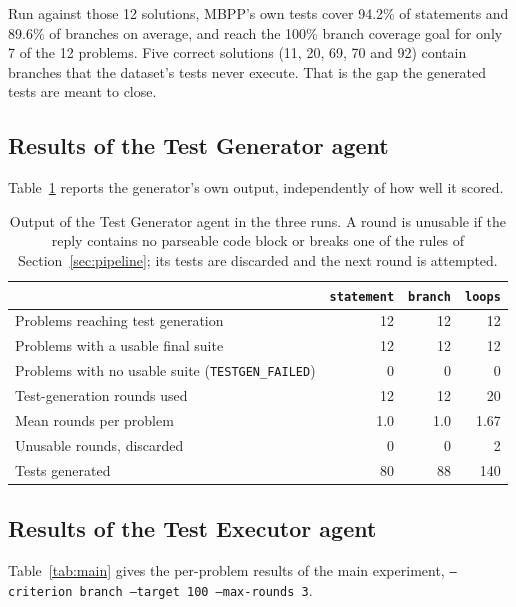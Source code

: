 \documentclass[11pt,a4paper]{article}
\begin{document}
Run against those 12 solutions, MBPP's own tests cover 94.2\% of statements and 89.6\% of branches on average,
and reach the 100\% branch coverage goal for only 7 of the 12 problems. Five correct solutions (11, 20, 69, 70
and 92) contain branches that the dataset's tests never execute. That is the gap the generated tests are meant
to close.

\subsection{Results of the Test Generator agent}

Table~\ref{tab:genresults} reports the generator's own output, independently of how well it scored.

\begin{table}[htbp]
\centering
\small
\caption{Output of the Test Generator agent in the three runs. A round is unusable if the reply contains no
parseable code block or breaks one of the rules of Section~\ref{sec:pipeline}; its tests are discarded and the
next round is attempted.}
\label{tab:genresults}
\begin{tabular}{@{}lrrr@{}}
\toprule
 & \texttt{statement} & \texttt{branch} & \texttt{loops} \\
\midrule
Problems reaching test generation & 12 & 12 & 12 \\
Problems with a usable final suite & 12 & 12 & 12 \\
Problems with no usable suite (\texttt{TESTGEN\_FAILED}) & 0 & 0 & 0 \\
Test-generation rounds used & 12 & 12 & 20 \\
Mean rounds per problem & 1.0 & 1.0 & 1.67 \\
Unusable rounds, discarded & 0 & 0 & 2 \\
Tests generated & 80 & 88 & 140 \\
\bottomrule
\end{tabular}
\end{table}

\subsection{Results of the Test Executor agent}

Table~\ref{tab:main} gives the per-problem results of the main experiment, \texttt{--criterion branch
--target 100 --max-rounds 3}.
\end{document}
